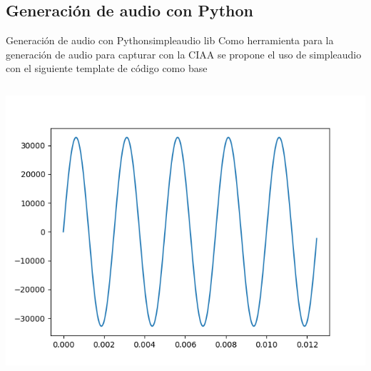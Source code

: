  \subsection{Generación de audio con Python}
 \begin{frame}{Generación de audio con Python}{simpleaudio lib}
    \handsonicon
    Como herramienta para la generación de audio para capturar con la CIAA se propone el uso de simpleaudio con el siguiente template de código como base
    \begin{columns}[onlytextwidth]
       
       \includegraphics[width=\textwidth]{1_clase/audio_gen1.png}
    \end{columns}
    \vfill
 \end{frame}
